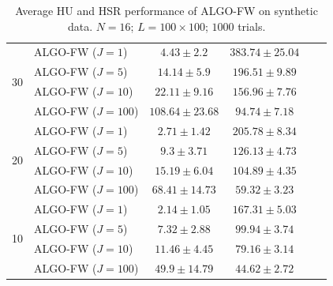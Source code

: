 \begin{table}[h]
\begin{adjustbox}{max width=\textwidth}
\begin{tabular}{|c|l|c|c|c|c|}
\multirow{4}{*}{30} & ALGO-FW ($J=1$)            & $4.43     \pm 2.2$    & $383.74   \pm 25.04$ \tabularnewline
                    & ALGO-FW ($J=5$)            & $14.14    \pm 5.9$    & $196.51   \pm 9.89$  \tabularnewline
                    & ALGO-FW ($J=10$)           & $22.11    \pm 9.16$   & $156.96   \pm 7.76$  \tabularnewline
                    & ALGO-FW ($J=100$)          & $108.64   \pm 23.68$  & $94.74    \pm 7.18$  \tabularnewline \cline{1-4}
\multirow{4}{*}{20} & ALGO-FW ($J=1$)            & $2.71     \pm 1.42$   & $205.78   \pm 8.34$ \tabularnewline
                    & ALGO-FW ($J=5$)            & $9.3      \pm 3.71$   & $126.13   \pm 4.73$ \tabularnewline
                    & ALGO-FW ($J=10$)           & $15.19    \pm 6.04$   & $104.89   \pm 4.35$ \tabularnewline
                    & ALGO-FW ($J=100$)          & $68.41    \pm 14.73$  & $59.32    \pm 3.23$ \tabularnewline \cline{1-4}
\multirow{4}{*}{10} & ALGO-FW ($J=1$)            & $2.14     \pm 1.05$   & $167.31   \pm 5.03$ \tabularnewline
                    & ALGO-FW ($J=5$)            & $7.32     \pm 2.88$   & $99.94    \pm 3.74$ \tabularnewline
                    & ALGO-FW ($J=10$)           & $11.46    \pm 4.45$   & $79.16    \pm 3.14$ \tabularnewline
                    & ALGO-FW ($J=100$)          & $49.9     \pm 14.79$  & $44.62    \pm 2.72$ \tabularnewline \cline{1-4}
\end{tabular}
\end{adjustbox}
\caption{Average HU and HSR performance of ALGO-FW on synthetic data.
         $N = 16$; $L = 100 \times 100$; $1000$ trials.}
\label{table:results_full_FW_MO16}
\end{table}

\newpage

